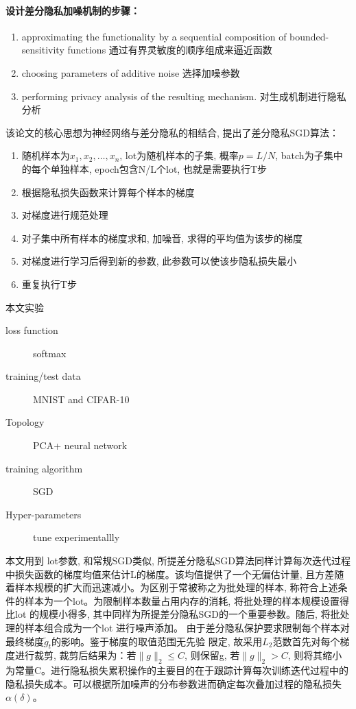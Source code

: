 \paragraph{设计差分隐私加噪机制的步骤：}
\begin{enumerate}
\item approximating the functionality by a sequential composition of bounded-sensitivity functions  通过有界灵敏度的顺序组成来逼近函数
\item choosing parameters of additive noise
选择加噪参数
\item 
performing privacy analysis of the resulting mechanism.
对生成机制进行隐私分析
\end{enumerate}


该论文的核心思想为神经网络与差分隐私的相结合, 提出了差分隐私SGD算法：
\begin{enumerate}
    \item 随机样本为${x_1, x_2, \dots,  x_n}$, lot为随机样本的子集, 概率$p=L/N$, batch为子集中的每个单独样本, epoch包含N/L个lot, 也就是需要执行T步
    \item 根据隐私损失函数来计算每个样本的梯度
    
    \item 对梯度进行规范处理
    \item 对子集中所有样本的梯度求和, 加噪音, 求得的平均值为该步的梯度
    \item 对梯度进行学习后得到新的参数, 此参数可以使该步隐私损失最小
    \item 重复执行T步
\end{enumerate} 

本文实验
\begin{description}
    \item[loss function ] softmax
    \item[training/test data ] MNIST and CIFAR-10
    \item[Topology ] PCA+ neural network
    \item[training algorithm ] SGD
    \item[Hyper-parameters] tune experimentallly

\end{description}


本文用到 lot参数, 和常规SGD类似, 所提差分隐私SGD算法同样计算每次迭代过程中损失函数的梯度均值来估计L的梯度。该均值提供了一个无偏估计量, 且方差随着样本规模的扩大而迅速减小。为区别于常被称之为批处理的样本, 称符合上述条件的样本为一个lot。为限制样本数量占用内存的消耗, 将批处理的样本规模设置得比lot 的规模小得多, 其中同样为所提差分隐私SGD的一个重要参数。随后, 将批处理的样本组合成为一个lot 进行噪声添加。 
由于差分隐私保护要求限制每个样本对最终梯度$\tilde{g}_t$的影响。鉴于梯度的取值范围无先验
限定, 故采用$L_2$范数首先对每个梯度进行裁剪, 
裁剪后结果为：若$\|g\|_2 \leq C$, 则保留g, 若$\|g \|_2 > C$, 则将其缩小为常量C。进行隐私损失累积操作的主要目的在于跟踪计算每次训练迭代过程中的隐私损失成本。可以根据所加噪声的分布参数进而确定每次叠加过程的隐私损失$α(\delta)$。



